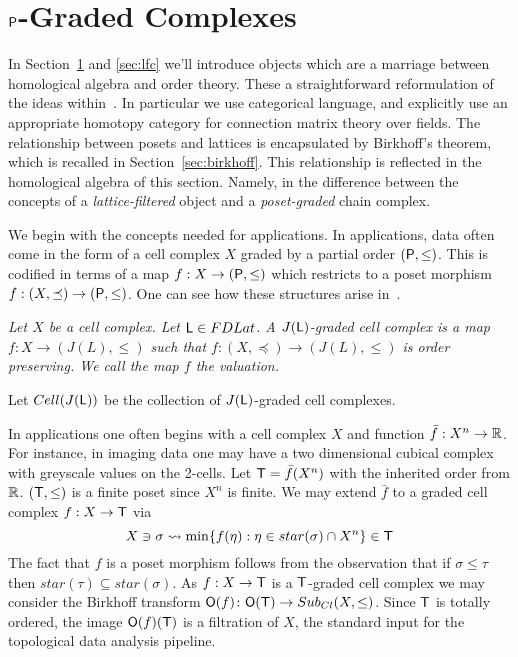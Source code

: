 

\section{${\mathsf P}$-Graded Complexes}\label{sec:grad}

In Section~\ref{sec:grad} and \ref{sec:lfc} we'll introduce objects which are a marriage between homological algebra and order theory.  These a straightforward reformulation of the ideas within~\cite[Section 7]{robbin:salamon2}.  In particular we use categorical language, and explicitly use an appropriate homotopy category for connection matrix theory over fields.    The relationship between posets and lattices is encapsulated by Birkhoff's theorem, which is recalled in Section~\ref{sec:birkhoff}.  This relationship is reflected in the homological algebra of this section.  Namely, in the difference between the concepts of a {\em lattice-filtered} object and a {\em poset-graded} chain complex.  

We begin with the concepts needed for applications.  In applications, data often come in the form of a cell complex $X$ graded by a partial order $({\mathsf P},\leq)$.  This is codified in terms of a map $f:X\to ({\mathsf P},\leq)$ which restricts to a poset morphism $f:(X,\preceq)\to ({\mathsf P},\leq)$.   One can see how these structures arise in~\cite{braids}.  

\begin{defn}
{\em
Let $X$ be a cell complex.  Let ${\mathsf L}\in FDLat$.  A {\em $J({\mathsf L})$-graded cell complex} is a map $f:X\to (J(L),\leq)$ such that $f:(X,\preceq)\to (J(L),\leq)$ is order preserving.  We call the map $f$ the {\em valuation}.
}
\end{defn}


Let $Cell(J({\mathsf L}))$ be the collection of $J({\mathsf L})$-graded cell complexes.  

\begin{ex}
In applications one often begins with a cell complex $X$ and function $\bar f:X^n\to {\mathbb{R}}$.  For instance, in imaging data one may have a two dimensional cubical complex with greyscale values on the 2-cells. Let ${\mathsf T}=\bar f(X^n)$ with the inherited order from ${\mathbb{R}}$.  $({\mathsf T},\leq)$ is a finite poset since $X^n$ is finite.  We may extend $\bar f$ to a graded cell complex $f:X\to {\mathsf T}$ via
\[
X\ni \sigma \rightsquigarrow \min\{f(\eta): \eta\in star(\sigma)\cap X^n\} \in {\mathsf T}
\]
The fact that $f$ is a poset morphism follows from the observation that if $\sigma \leq \tau$ then $star(\tau)\subseteq star(\sigma)$.   As $f:X\to {\mathsf T}$ is a ${\mathsf T}$-graded cell complex we may consider the Birkhoff transform ${\mathsf O}(f)\colon {\mathsf O}({\mathsf T})\to Sub_{Cl}(X,\leq)$.  Since ${\mathsf T}$ is totally ordered, the image ${\mathsf O}(f)({\mathsf T})$ is a filtration of $X$, the standard input for the topological data analysis pipeline.
\end{ex}

